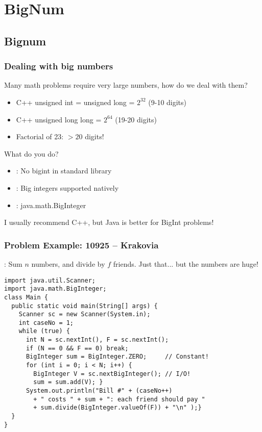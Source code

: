\documentclass{beamer}
\begin{document}
\section{BigNum}
\subsection{Bignum}
\begin{frame}
  \frametitle{Dealing with big numbers}

  {\smaller
  \begin{block}{}
    Many math problems require very large numbers, how do we deal with them?
  \end{block}

  \begin{itemize}
  \item C++ unsigned int = unsigned long = $2^{32}$ (9-10 digits)
  \item C++ unsigned long long = $2^{64}$ (19-20 digits)

    \medskip

  \item Factorial of 23: $> 20$ digits!
  \end{itemize}

  \begin{block}{What do you do?}
    \begin{itemize}
    \item {}: No bigint in standard library
    \item {}: Big integers supported natively
    \item {}: java.math.BigInteger
    \end{itemize}
    
    \medskip

    I usually recommend C++, but Java is better for BigInt problems!
  \end{block}  
  }
\end{frame}

\begin{frame}[fragile]
  \frametitle{Problem Example: 10925 -- Krakovia}

  {\smaller
    
  : Sum $n$ numbers, and divide by $f$
  friends. Just that... but the numbers are huge!

\begin{block}{}
\begin{verbatim}
import java.util.Scanner;
import java.math.BigInteger;
class Main {
  public static void main(String[] args) {
    Scanner sc = new Scanner(System.in);
    int caseNo = 1;
    while (true) {
      int N = sc.nextInt(), F = sc.nextInt(); 
      if (N == 0 && F == 0) break;
      BigInteger sum = BigInteger.ZERO;     // Constant!  
      for (int i = 0; i < N; i++) {
        BigInteger V = sc.nextBigInteger(); // I/O!  
        sum = sum.add(V); }                   
      System.out.println("Bill #" + (caseNo++) 
        + " costs " + sum + ": each friend should pay " 
        + sum.divide(BigInteger.valueOf(F)) + "\n" );}
  }
}
\end{verbatim}    
  \end{block}}
\end{frame}
\end{document}
